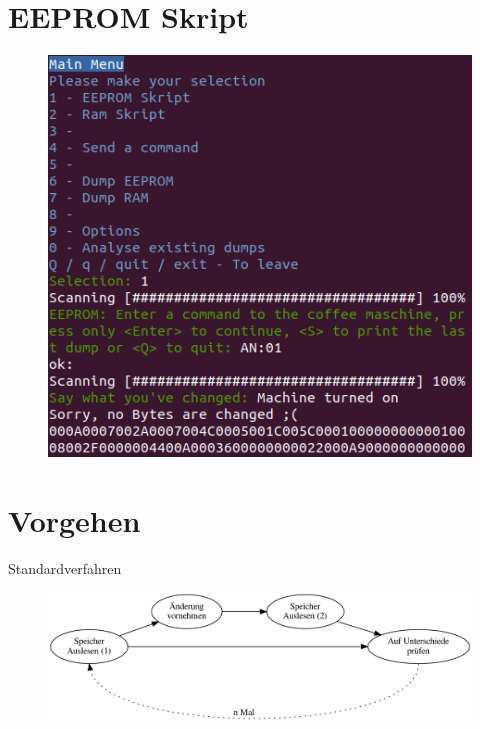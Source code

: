 \documentclass[
  de, %
  inputenc=utf8,
]{tuhhslides}
\begin{document}
\AtBeginSection{%
}

\section*{EEPROM Skript}
\begin{frame}
  \begin{figure}
    \begin{center}
      \hspace*{-0.8cm}
      \includegraphics[scale=0.5]{Material/JuraCoffeeMemory-3-EEPROM-NothingChanged}
    \end{center}
  \end{figure}
\end{frame}

\section*{Vorgehen}
\begin{frame}{Standardverfahren}
  \begin{figure}
    \begin{center}
      \hspace*{-1cm}
      \includegraphics[scale=0.54]{Material/workflow}
    \end{center}
  \end{figure}
\end{frame}
\end{document}
